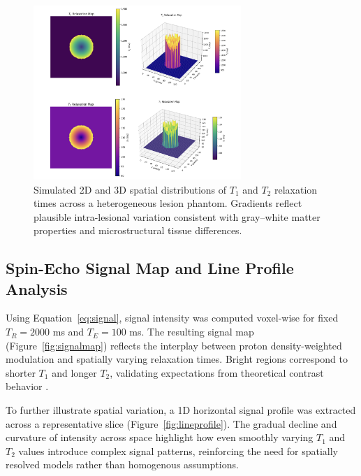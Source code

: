 \documentclass[10pt,a4paper,twoside]{article}
\begin{document}
\begin{figure}[htbp!]
\centering
\includegraphics[width=0.7\textwidth]{figures/t1t2maps.png}
\caption{Simulated 2D and 3D spatial distributions of $T_1$ and $T_2$ relaxation times across a heterogeneous lesion phantom. Gradients reflect plausible intra-lesional variation consistent with gray–white matter properties and microstructural tissue differences.}
\label{fig:t1t2maps}
\end{figure}


\subsection{Spin-Echo Signal Map and Line Profile Analysis}

Using Equation~\eqref{eq:signal}, signal intensity was computed voxel-wise for fixed $ T_R = 2000 $ ms and $ T_E = 100 $ ms. The resulting signal map (Figure~\ref{fig:signalmap}) reflects the interplay between proton density-weighted modulation and spatially varying relaxation times. Bright regions correspond to shorter $ T_1 $ and longer $ T_2 $, validating expectations from theoretical contrast behavior \cite{bernstein2004, brown2014}.

To further illustrate spatial variation, a 1D horizontal signal profile was extracted across a representative slice (Figure~\ref{fig:lineprofile}). The gradual decline and curvature of intensity across space highlight how even smoothly varying $ T_1 $ and $ T_2 $ values introduce complex signal patterns, reinforcing the need for spatially resolved models rather than homogenous assumptions.
\end{document}

